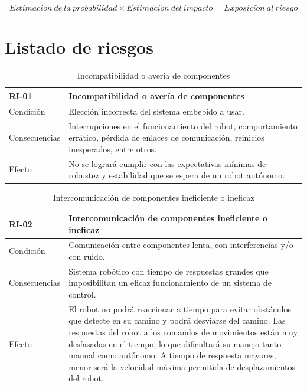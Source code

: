 \begin{equation}
    Estimaci\acute{o}n\ de\ la\ probabilidad \times Estimaci\acute{o}n\ del\ impacto = Exposici\acute{o}n\ al\ riesgo
\end{equation}

\section{Listado de riesgos}

\begin{table}[H]
\centering
\begin{tabular} {|m{2.5cm}|m{11.5cm}|}
    \hline \rowcolor{test_header_color}
    RI-01 & Incompatibilidad o avería de componentes \\
    \hline
        Condición & Elección incorrecta del sistema embebido a usar. \\
    \hline
        Consecuencias & Interrupciones en el funcionamiento del robot, comportamiento errático, pérdida de enlaces de comunicación, reinicios inesperados, entre otros. \\
    \hline
        Efecto & No se logrará cumplir con las expectativas mínimas de robustez y estabilidad que se espera de un robot autónomo. \\
    \hline
\end{tabular}
\label{}
\caption{Incompatibilidad o avería de componentes}
\end{table}

\begin{table}[H]
\centering
\begin{tabular} {|m{2.5cm}|m{11.5cm}|}
    \hline \rowcolor{test_header_color}
    RI-02 & Intercomunicación de componentes ineficiente o ineficaz \\
    \hline
        Condición & Comunicación entre componentes lenta, con interferencias y/o con ruido. \\
    \hline
        Consecuencias & Sistema robótico con tiempo de respuestas grandes que imposibilitan un eficaz funcionamiento de un sistema de control. \\
    \hline
        Efecto & El robot no podrá reaccionar a tiempo para evitar obstáculos que detecte en su camino y podrá desviarse del camino. Las respuestas del robot a los comandos de movimientos están muy desfasadas en el tiempo, lo que dificultará su manejo tanto manual como autónomo. A tiempo de respuesta mayores, menor será la velocidad máxima permitida de desplazamientos del robot. \\
    \hline
    \end{tabular}
\caption{Intercomunicación de componentes ineficiente o ineficaz}
\end{table}

